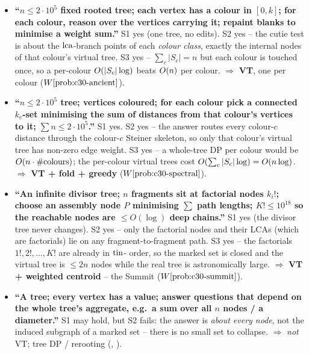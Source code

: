 \begin{itemize}[leftmargin=1.4em]
  \item \textbf{``\(n\le2\cdot10^5\) fixed rooted tree; each vertex has a colour in
        \([0,k]\); for each colour, reason over the vertices carrying it; repaint
        blanks to minimise a weight sum.''} S1 yes (one tree, no edits). S2 yes --
        the cutie test is about the \(\operatorname{lca}\)-branch points of each \emph{colour
        class}, exactly the internal nodes of that colour's virtual tree. S3 yes --
        \(\sum_c|S_c|=n\) but each colour is touched once, so a per-colour
        \(O(|S_c|\log)\) beats \(O(n)\) per colour. \(\Rightarrow\) \textbf{VT},
        one per colour (\(\probref{c30-ancient}\)).
  \item \textbf{``\(n\le2\cdot10^5\) tree; vertices coloured; for each colour pick a
        connected \(k_c\)-set minimising the sum of distances from that colour's
        vertices to it; \(\sum n\le2\cdot10^5\).''} S1 yes. S2 yes -- the answer
        routes every colour-\(c\) distance through the colour-\(c\) Steiner skeleton,
        so only that colour's virtual tree has non-zero edge weight. S3 yes -- a
        whole-tree DP per colour would be \(O(n\cdot\#\text{colours})\); the
        per-colour virtual trees cost \(O(\sum_c |S_c|\log)=O(n\log)\).
        \(\Rightarrow\) \textbf{VT + fold + greedy} (\(\probref{c30-spectral}\)).
  \item \textbf{``An infinite divisor tree; \(n\) fragments sit at factorial nodes
        \(k_i!\); choose an assembly node \(P\) minimising \(\sum\) path lengths;
        \(K!\le10^{18}\) so the reachable nodes are \(\le O(\log)\) deep chains.''}
        S1 yes (the divisor tree never changes). S2 yes -- only the factorial
        nodes and their LCAs (which are factorials) lie on any fragment-to-fragment
        path. S3 yes -- the factorials \(1!,2!,\dots,K!\) are already in \(\operatorname{tin}\)-
        order, so the marked set is closed and the virtual tree is \(\le 2n\) nodes
        while the real tree is astronomically large. \(\Rightarrow\) \textbf{VT +
        weighted centroid} -- the Summit (\(\probref{c30-summit}\)).
  \item \textbf{``A tree; every vertex has a value; answer questions that depend on
        the whole tree's aggregate, e.g.\ a sum over all \(n\) nodes / a diameter.''}
        S1 may hold, but S2 fails: the answer is \emph{about every node}, not the
        induced subgraph of a marked set -- there is no small set to collapse.
        \(\Rightarrow\) \emph{not} VT; tree DP / rerooting (, ).

\end{itemize}
